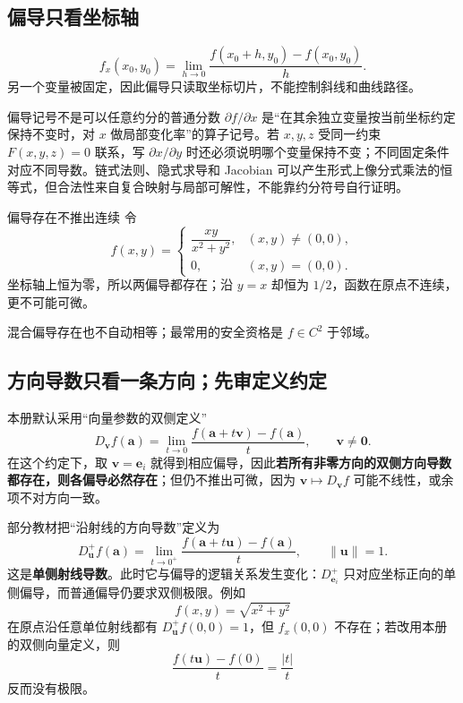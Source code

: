 \documentclass[11pt,a4paper,fontset=fandol]{ctexart}
\begin{document}
\subsection{偏导只看坐标轴}
\[
f_x(x_0,y_0)=\lim_{h\to0}\frac{f(x_0+h,y_0)-f(x_0,y_0)}h.
\]
另一个变量被固定，因此偏导只读取坐标切片，不能控制斜线和曲线路径。

\begin{warnbox}{偏导记号不是可以任意约分的普通分数}
$\partial f/\partial x$ 是“在其余独立变量按当前坐标约定保持不变时，对 $x$ 做局部变化率”的算子记号。若 $x,y,z$ 受同一约束 $F(x,y,z)=0$ 联系，写 $\partial x/\partial y$ 时还必须说明哪个变量保持不变；不同固定条件对应不同导数。链式法则、隐式求导和 Jacobian 可以产生形式上像分式乘法的恒等式，但合法性来自复合映射与局部可解性，不能靠约分符号自行证明。
\end{warnbox}

\begin{warnbox}{偏导存在不推出连续}
令
\[
f(x,y)=
\begin{cases}
\dfrac{xy}{x^2+y^2},&(x,y)\ne(0,0),\\0,&(x,y)=(0,0).
\end{cases}
\]
坐标轴上恒为零，所以两偏导都存在；沿 $y=x$ 却恒为 $1/2$，函数在原点不连续，更不可能可微。
\end{warnbox}

混合偏导存在也不自动相等；最常用的安全资格是 $f\in C^2$ 于邻域。

\subsection{方向导数只看一条方向；先审定义约定}

本册默认采用“向量参数的双侧定义”
\[
D_{\mathbf v}f(\mathbf a)
=\lim_{t\to0}\frac{f(\mathbf a+t\mathbf v)-f(\mathbf a)}t,
\qquad \mathbf v\ne\mathbf0.
\]
在这个约定下，取 $\mathbf v=\mathbf e_i$ 就得到相应偏导，因此\textbf{若所有非零方向的双侧方向导数都存在，则各偏导必然存在}；但仍不推出可微，因为 $\mathbf v\mapsto D_{\mathbf v}f$ 可能不线性，或余项不对方向一致。

部分教材把“沿射线的方向导数”定义为
\[
D_{\mathbf u}^{+}f(\mathbf a)
=\lim_{t\to0^+}\frac{f(\mathbf a+t\mathbf u)-f(\mathbf a)}t,
\qquad \lVert\mathbf u\rVert=1.
\]
这是\textbf{单侧射线导数}。此时它与偏导的逻辑关系发生变化：$D_{\mathbf e_i}^{+}$ 只对应坐标正向的单侧偏导，而普通偏导仍要求双侧极限。例如
\[
f(x,y)=\sqrt{x^2+y^2}
\]
在原点沿任意单位射线都有 $D_{\mathbf u}^{+}f(0,0)=1$，但 $f_x(0,0)$ 不存在；若改用本册的双侧向量定义，则
\[
\frac{f(t\mathbf u)-f(0)}t=\frac{\lvert t\rvert}{t}
\]
反而没有极限。
\end{document}
